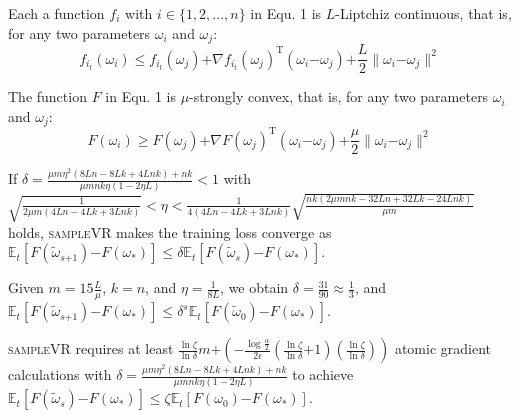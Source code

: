 \documentclass[letterpaper]{article}
\begin{document}
\begin{Assumption}
\label{assumption_liptchiz}
Each a function $f_i$ with $i\in\{1,2, ..., n\}$ in Equ. 1 is $L$-Liptchiz continuous, that is, for any two parameters $\omega_i$ and $\omega_j$:
$$f_{i_t}(\omega_i)\le f_{i_t}(\omega_j)\mathrm{+}\nabla f_{i_t}(\omega_j)^\mathrm{T} (\omega_i\mathrm{-}\omega_j)\mathrm{+}\frac{L}{2}\parallel \omega_i\mathrm{-}\omega_j\parallel^2$$


\end{Assumption}

\begin{Assumption}
\label{assumption_strongly_convex}
The function $F$ in Equ. 1 is $\mu$-strongly convex, that is, for any two parameters $\omega_i$ and $\omega_j$:
$$F(\omega_i)\ge F(\omega_j)\mathrm{+}\nabla F(\omega_j)^\mathrm{T} (\omega_i\mathrm{-}\omega_j)\mathrm{+}\frac{\mu}{2}\parallel \omega_i\mathrm{-}\omega_j\parallel^2$$
\end{Assumption}

\begin{Theorem}
\label{Theorem_converge}
If $\delta=\frac{\mu m \eta^2 (8Ln-8Lk+4Lnk)+nk}{  \mu m nk \eta (1-2\eta L)  } < 1$ with $\sqrt{\frac{1}{2\mu m (4Ln-4Lk+3Lnk)}} < \eta < \frac{1}{4(4Ln-4Lk+3Lnk)}\sqrt{\frac{nk(2\mu mnk - 32Ln+ 32 Lk -24 Lnk)}{\mu m}}$ holds, \textsc{sampleVR} makes the training loss converge as
$\mathbb{E}_t[F(\tilde{\omega}_{s\mathrm{+}1}) \mathrm{-} F(\omega_\ast)]  \le \delta \mathbb{E}_t[F(\tilde{\omega}_s)\mathrm{-}F(\omega_\ast)]$.
\end{Theorem}

\begin{Corollary}
\label{Corollary_converge}
Given $m\mathrm{=}15\frac{L}{\mu}$, $k\mathrm{=}n$, and $\eta\mathrm{=}\frac{1}{8L}$, we obtain $\delta \mathrm{=} \frac{31}{90} \mathrm{\approx} \frac{1}{3}$, and $\mathbb{E}_t[F(\tilde{\omega}_{s\mathrm{+}1}) \mathrm{-} F(\omega_\ast)]  \le \delta^s \mathbb{E}_t[F(\tilde{\omega}_0)\mathrm{-}F(\omega_\ast)]$.

\end{Corollary}


\begin{Theorem}
\label{theorem_gradient_complexity}
\textsc{sampleVR} requires at least  $\frac{\ln \zeta}{\ln \delta}m\mathrm{+}\left( \mathrm{-} \frac{\log\frac{\alpha}{2}}{2\epsilon} (\frac{\ln \zeta}{\ln \delta}\mathrm{+}1)(\frac{\ln \zeta}{\ln \delta})\right)$ atomic gradient calculations with $ \delta=\frac{\mu m \eta^2 (8Ln-8Lk+4Lnk)+nk}{  \mu m nk \eta (1-2\eta L)  } $ to achieve $\mathbb{E}_t[F(\tilde{\omega}_s)\mathrm{-}F(\omega_\ast)] \mathrm{\le} \zeta \mathbb{E}_t[F(\omega_0)\mathrm{-}F(\omega_\ast)]$.
\end{Theorem}
\end{document}
